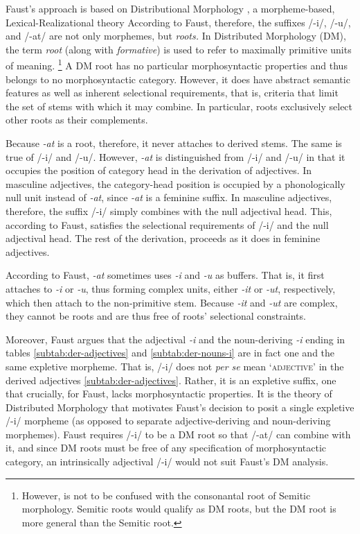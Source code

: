 Faust's approach is based on Distributional Morphology 
 \citep{halle-and-marantz:1993}, 
a morpheme-based, Lexical-Realizational theory \citep{stump:2001}
According to Faust, therefore, the suffixes /-i/, /-u/, and /-at/ are not only morphemes, 
but \emph{roots.}
In Distributed Morphology (DM), the term \emph{root} (along with \emph{formative}) is used to refer 
to maximally primitive units of meaning. \footnote{However, is not to be confused with the 
consonantal root of Semitic morphology. Semitic roots would qualify as 
DM roots, but the DM root is more general than the Semitic root.}
A DM root has no particular morphosyntactic properties and thus belongs to 
no morphosyntactic category.
However, it does have abstract semantic features as well as inherent 
selectional requirements, that is, criteria that limit the set of stems with which it 
may combine. In particular, roots exclusively select 
other roots as their complements.  

Because \textit{-at} is a root, therefore, it
never attaches to derived stems. The same is true of /-i/ and /-u/.  
However, \textit{-at} is distinguished from /-i/ and /-u/ in that it occupies the 
position of category head in the derivation of adjectives.
In masculine adjectives, the category-head position is occupied by a phonologically null unit instead of
\textit{-at}, since \textit{-at} is a feminine suffix. %
In masculine adjectives, therefore, the suffix /-i/ simply combines with the null adjectival head. 
This, according to Faust, satisfies the selectional requirements of /-i/
and the null adjectival head. The rest of the derivation,
proceeds as it does in feminine adjectives. 

According to Faust, \textit{-at} sometimes uses \textit{-i} and 
\textit{-u} as buffers. That is, it first attaches to \textit{-i} or \textit{-u}, 
thus forming complex units, either \emph{-it} or \emph{-ut}, respectively, 
which then attach to
the non-primitive stem. Because \emph{-it} and \emph{-ut} are complex, 
they cannot be roots and are thus free of roots' selectional constraints.

Moreover, Faust argues that the adjectival \textit{-i} and 
the noun-deriving \textit{-i} ending in tables 
\ref{subtab:der-adjectives} and \ref{subtab:der-nouns-i} 
are in fact one and the same expletive morpheme. That is, 
/-i/ does not \textit{per se} mean `\textsc{adjective}' in the derived adjectives 
\ref{subtab:der-adjectives}. Rather, it is an expletive suffix, one that 
crucially, for Faust, lacks morphosyntactic properties.
It is the theory of Distributed Morphology that motivates Faust's decision to posit a single 
expletive /-i/ morpheme (as opposed to 
separate adjective-deriving and noun-deriving morphemes).  Faust 
requires /-i/ to be a DM root so that /-at/ can combine with it, and since 
DM roots must be free of any specification of morphosyntactic 
category, an intrinsically adjectival /-i/ would
not suit Faust's DM analysis. 

